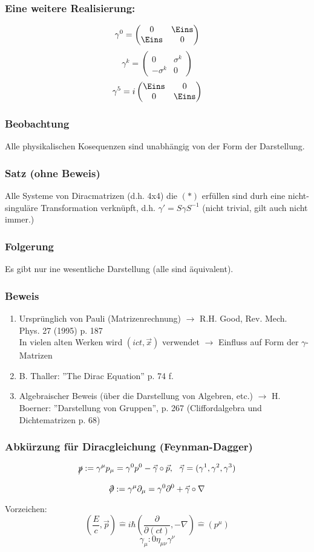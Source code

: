\documentclass[twoside,a4paper]{scrartcl}
\renewcommand{\1}{\mathds{1}}
\newcommand{\ra}{\rightarrow}
\newcommand{\entspricht}{\mathrel{\widehat{=}}}
\begin{document}
\subsubsection*{Eine weitere Realisierung:}
$$\gamma^0=\begin{pmatrix} 0& \Eins \\ \Eins & 0\end{pmatrix}$$
$$\gamma^k=\begin{pmatrix} 0& \sigma^k \\ -\sigma^k & 0\end{pmatrix}$$
$$\gamma^5=i\begin{pmatrix} \Eins & 0 \\ 0 & \Eins \end{pmatrix}$$
\subsubsection*{Beobachtung}
Alle physikalischen Kosequenzen sind unabhängig von der Form der Darstellung.
\subsubsection*{Satz (ohne Beweis)}
Alle Systeme von Diracmatrizen (d.h. 4x4) die $(*)$ erfüllen sind durh eine nicht-singuläre Transformation verknüpft, d.h. $\gamma'=S\gamma S^{-1}$ (nicht trivial, gilt auch nicht immer.)
\subsubsection*{Folgerung}
Es gibt nur ine wesentliche Darstellung (alle sind äquivalent).
\subsubsection*{Beweis}
\begin{enumerate}
\item Ursprünglich von Pauli (Matrizenrechnung) $\ra$ R.H. Good, Rev. Mech. Phys. 27 (1995) p. 187\\
In vielen alten Werken wird $(ict,\vec x)$ verwendet $\ra$ Einfluss auf Form der $\gamma$-Matrizen
\item B. Thaller: ''The Dirac Equation'' p. 74 f.
\item Algebraischer Beweis (über die Darstellung von Algebren, etc.) $\ra$ H. Boerner: ''Darstellung von Gruppen'', p. 267 (Cliffordalgebra und Dichtematrizen p. 68)
\end{enumerate}
\subsubsection*{Abkürzung für Diracgleichung (Feynman-Dagger)}
$$\xout{p}:=\gamma^\mu p_\mu=\gamma^0p^0-\vec \gamma \circ\vec p, \ \ \vec \gamma=(\gamma^1,\gamma^2,\gamma^3)$$
$$\xout{\partial}:=\gamma^\mu \partial_\mu=\gamma^0\partial^0+\vec \gamma \circ \nabla$$
Vorzeichen:
$$(\frac{E}{c},\vec p)\entspricht i\hbar(\frac{\partial}{\partial (ct)},-\nabla)\entspricht (p^\mu)$$
$$\gamma_\mu:0 \eta_{\mu\nu}\gamma^\nu$$
\end{document}
